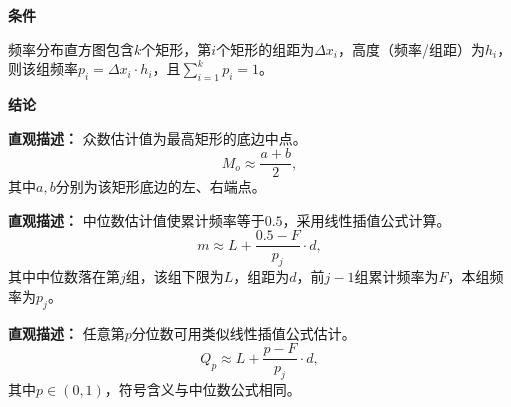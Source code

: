 \begin{statementbox}
	\textbf{\textcolor{CStatement}{条件}}
	\begin{description}[style=nextline, leftmargin=2.8em, labelsep=0.5em, itemsep=0.35em]
		\item[\textbf{\textcolor{CStatement}{条件 1（直方图分组）：}}] 频率分布直方图包含$k$个矩形，第$i$个矩形的组距为$\Delta x_i$，高度（频率/组距）为$h_i$，则该组频率$p_i = \Delta x_i \cdot h_i$，且$\sum_{i=1}^{k} p_i = 1$。
	\end{description}

	\textbf{\textcolor{CStatement}{结论}}
	\begin{description}[style=nextline, leftmargin=2.8em, labelsep=0.5em, itemsep=0.45em]
		\item[\textbf{\textcolor{CStatement}{结论一（众数估计）：}}]
			\textbf{\textcolor{CStatement}{直观描述：}}
			众数估计值为最高矩形的底边中点。
			\[
				M_o \approx \frac{a+b}{2},
			\]
			其中$a,b$分别为该矩形底边的左、右端点。

		\item[\textbf{\textcolor{CStatement}{结论二（中位数估计）：}}]
			\textbf{\textcolor{CStatement}{直观描述：}}
			中位数估计值使累计频率等于$0.5$，采用线性插值公式计算。
			\[
				m \approx L + \frac{0.5 - F}{p_j} \cdot d,
			\]
			其中中位数落在第$j$组，该组下限为$L$，组距为$d$，前$j-1$组累计频率为$F$，本组频率为$p_j$。

		\item[\textbf{\textcolor{CStatement}{推广结论（分位数估计）：}}]
			\textbf{\textcolor{CStatement}{直观描述：}}
			任意第$p$分位数可用类似线性插值公式估计。
			\[
				Q_p \approx L + \frac{p - F}{p_j} \cdot d,
			\]
			其中$p \in (0,1)$，符号含义与中位数公式相同。
	\end{description}
\end{statementbox}

